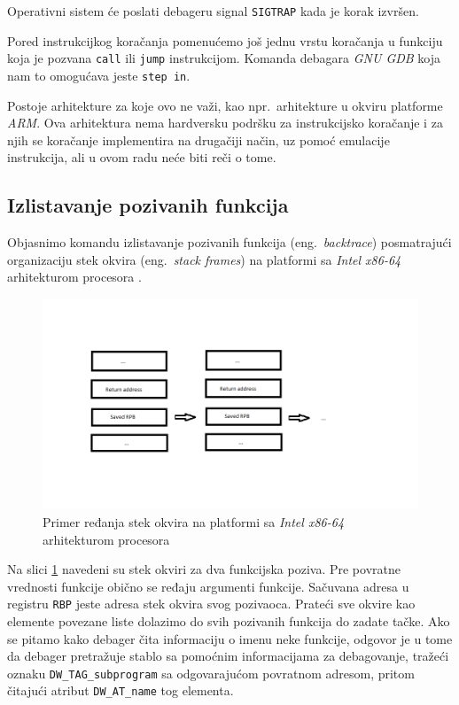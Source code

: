\documentclass[12pt,oneside]{memoir}
\begin{document}
Operativni sistem će poslati debageru signal \texttt{SIGTRAP} kada je korak izvršen.

Pored instrukcijkog koračanja pomenućemo još jednu vrstu koračanja u funkciju koja je pozvana \texttt{call} ili \texttt{jump} instrukcijom. Komanda debagara \emph{GNU GDB} koja nam to omogućava jeste \texttt{step in}.

Postoje arhitekture za koje ovo ne važi, kao npr.~arhitekture u okviru platforme \emph{ARM}. Ova arhitektura nema hardversku podršku za instrukcijsko koračanje i za njih se koračanje implementira na drugačiji način, uz pomoć emulacije instrukcija, ali u ovom radu neće biti reči o tome.

\subsection{Izlistavanje pozivanih funkcija}

Objasnimo komandu izlistavanje pozivanih funkcija (eng.~\emph{backtrace}) posmatrajući organizaciju stek okvira (eng.~\emph{stack frames}) na platformi sa \emph{Intel x86-64} arhitekturom procesora \cite{GDB}.

\begin{figure}[H]
	\begin{center}
		\includegraphics[scale=0.6]{slike/stack_frame.png}
	\end{center}
	\caption{Primer ređanja stek okvira na platformi sa \emph{Intel x86-64} arhitekturom procesora}
	\label{fig:stack}
\end{figure}

Na slici \ref{fig:stack} navedeni su stek okviri za dva funkcijska poziva. Pre povratne vrednosti funkcije obično se ređaju argumenti funkcije. Sačuvana adresa u registru \texttt{RBP} jeste adresa stek okvira svog pozivaoca. Prateći sve okvire kao elemente povezane liste dolazimo do svih pozivanih funkcija do zadate tačke. Ako se pitamo kako debager čita informaciju o imenu neke funkcije, odgovor je u tome da debager pretražuje stablo sa pomoćnim informacijama za debagovanje, tražeći oznaku \texttt{DW\_TAG\_subprogram} sa odgovarajućom povratnom adresom, pritom čitajući atribut \texttt{DW\_AT\_name} tog elementa.
\end{document}
